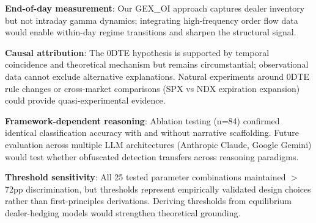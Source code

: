 \noindent\textbf{End-of-day measurement}: Our GEX\_OI approach captures dealer inventory but not intraday gamma dynamics; integrating high-frequency order flow data would enable within-day regime transitions and sharpen the structural signal.

\noindent\textbf{Causal attribution}: The 0DTE hypothesis is supported by temporal coincidence and theoretical mechanism but remains circumstantial; observational data cannot exclude alternative explanations. Natural experiments around 0DTE rule changes or cross-market comparisons (SPX vs NDX expiration expansion) could provide quasi-experimental evidence.

\noindent\textbf{Framework-dependent reasoning}: Ablation testing (n=84) confirmed identical classification accuracy with and without narrative scaffolding. Future evaluation across multiple LLM architectures (Anthropic Claude, Google Gemini) would test whether obfuscated detection transfers across reasoning paradigms.

\noindent\textbf{Threshold sensitivity}: All 25 tested parameter combinations maintained $>$72pp discrimination, but thresholds represent empirically validated design choices rather than first-principles derivations. Deriving thresholds from equilibrium dealer-hedging models would strengthen theoretical grounding.
